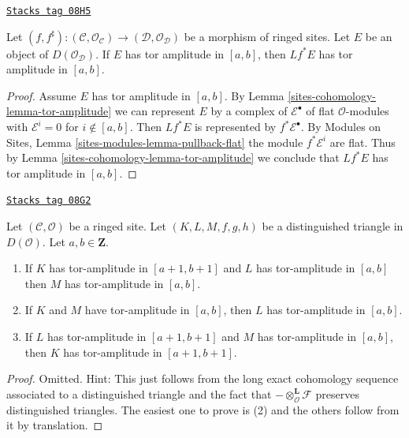 \begin{lemma}
\label{sites-cohomology-lemma-tor-amplitude-pullback}
\href{https://stacks.math.columbia.edu/tag/08H5}{\texttt{Stacks tag 08H5}}

Let $(f, f^\sharp) : (\mathcal{C}, \mathcal{O}_\mathcal{C}) \to
(\mathcal{D}, \mathcal{O}_\mathcal{D})$
be a morphism of ringed sites.
Let $E$ be an object of $D(\mathcal{O}_\mathcal{D})$.
If $E$ has tor amplitude in $[a, b]$,
then $Lf^*E$ has tor amplitude in $[a, b]$.
\end{lemma}

\begin{proof}
Assume $E$ has tor amplitude in $[a, b]$. By
Lemma \ref{sites-cohomology-lemma-tor-amplitude}
we can represent $E$ by a complex of
$\mathcal{E}^\bullet$ of flat $\mathcal{O}$-modules with
$\mathcal{E}^i = 0$ for $i \not \in [a, b]$. Then
$Lf^*E$ is represented by $f^*\mathcal{E}^\bullet$.
By Modules on Sites, Lemma \ref{sites-modules-lemma-pullback-flat}
the module $f^*\mathcal{E}^i$ are flat.
Thus by Lemma \ref{sites-cohomology-lemma-tor-amplitude}
we conclude that $Lf^*E$ has tor amplitude in $[a, b]$.
\end{proof}

\begin{lemma}
\label{sites-cohomology-lemma-cone-tor-amplitude}
\href{https://stacks.math.columbia.edu/tag/08G2}{\texttt{Stacks tag 08G2}}

Let $(\mathcal{C}, \mathcal{O})$ be a ringed site.
Let $(K, L, M, f, g, h)$ be a distinguished
triangle in $D(\mathcal{O})$. Let $a, b \in \mathbf{Z}$.
\begin{enumerate}
\item If $K$ has tor-amplitude in $[a + 1, b + 1]$ and
$L$ has tor-amplitude in $[a, b]$ then $M$ has
tor-amplitude in $[a, b]$.
\item If $K$ and $M$ have tor-amplitude in $[a, b]$, then
$L$ has tor-amplitude in $[a, b]$.
\item If $L$ has tor-amplitude in $[a + 1, b + 1]$
and $M$ has tor-amplitude in $[a, b]$, then
$K$ has tor-amplitude in $[a + 1, b + 1]$.
\end{enumerate}
\end{lemma}

\begin{proof}
Omitted. Hint: This just follows from the long exact cohomology sequence
associated to a distinguished triangle and the fact that
$- \otimes_\mathcal{O}^{\mathbf{L}} \mathcal{F}$
preserves distinguished triangles.
The easiest one to prove is (2) and the others follow from it by
translation.
\end{proof}

